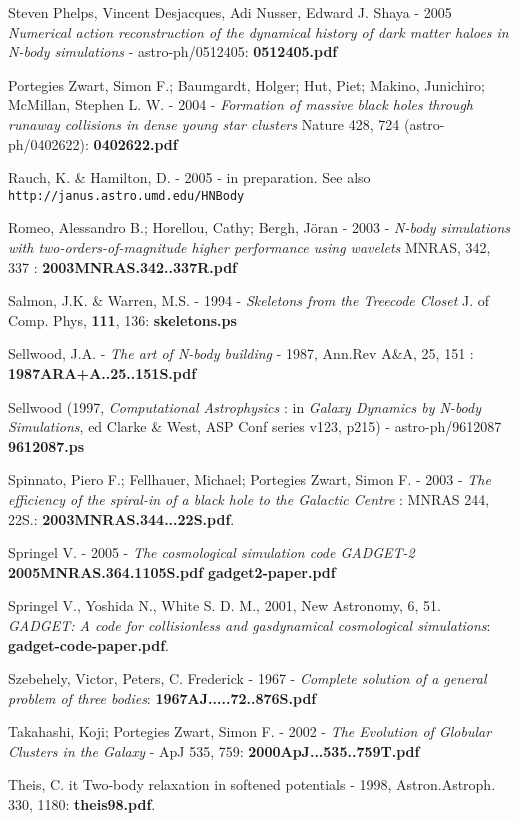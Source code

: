 {Steven Phelps, Vincent Desjacques, Adi Nusser, Edward J. Shaya - 2005
{\it Numerical action reconstruction of the dynamical history of dark matter haloes in N-body simulations} -
astro-ph/0512405:   {\bf 0512405.pdf}

Portegies Zwart, Simon F.; Baumgardt, Holger; Hut, Piet; Makino, Junichiro; McMillan, Stephen L. W. -
2004 - {\it Formation of massive black holes through runaway collisions in dense young star clusters}
Nature 428, 724 (astro-ph/0402622): {\bf 0402622.pdf}

Rauch, K. \& Hamilton, D. - 2005 - in preparation. See also
{\tt http://janus.astro.umd.edu/HNBody}


Romeo, Alessandro B.; Horellou, Cathy; Bergh, Jöran - 2003 - 
{\it N-body simulations with two-orders-of-magnitude higher performance using wavelets}
MNRAS, 342, 337 : {\bf 2003MNRAS.342..337R.pdf}

Salmon, J.K. \& Warren, M.S. - 1994 -
{\it Skeletons from the Treecode Closet} J. of Comp. Phys, {\bf 111}, 136:
{\bf skeletons.ps}

Sellwood, J.A. - {\it The art of N-body building} - 1987, Ann.Rev A\&A, 25, 151 : 
{\bf 1987ARA+A..25..151S.pdf}


Sellwood (1997, {\it Computational Astrophysics} :
in {\it Galaxy Dynamics by N-body Simulations},
ed Clarke \& West,  ASP  Conf  series  v123, p215) - astro-ph/9612087
{\bf 9612087.ps}

Spinnato, Piero F.; Fellhauer, Michael; Portegies Zwart, Simon F. - 2003 -
{\it The efficiency of the spiral-in of a black hole to the Galactic Centre} :
MNRAS 244, 22S.: {\bf 2003MNRAS.344...22S.pdf}.

Springel V. - 2005 -
{\it The cosmological simulation code GADGET-2}
{\bf 2005MNRAS.364.1105S.pdf} {\bf gadget2-paper.pdf}

Springel V., Yoshida N., White S. D. M., 2001, New Astronomy, 6, 51. 
{\it GADGET: A code for collisionless and gasdynamical cosmological simulations}:
{\bf gadget-code-paper.pdf}.

Szebehely, Victor, Peters, C. Frederick - 1967 - 
{\it Complete solution of a general problem of three bodies}:
{\bf 1967AJ.....72..876S.pdf}

Takahashi, Koji; Portegies Zwart, Simon F. - 2002 -
{\it The Evolution of Globular Clusters in the Galaxy} - ApJ 535, 759:
{\bf 2000ApJ...535..759T.pdf}

Theis, C. {it  Two-body relaxation in softened potentials} - 1998, Astron.Astroph. 330, 1180:
{\bf theis98.pdf}.

}
